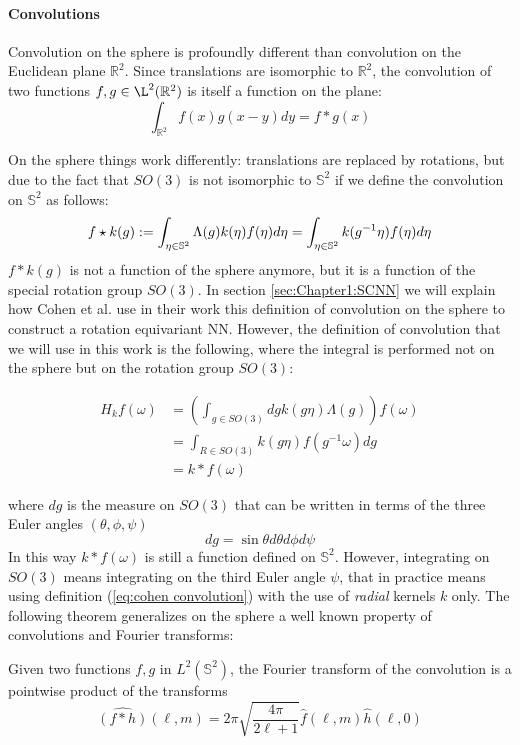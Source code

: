 \paragraph{Convolutions}
Convolution on the sphere is profoundly different than convolution on the Euclidean plane $\mathbb R^2$. Since translations are isomorphic to $\mathbb R^2$, the convolution of two functions $f, g \in \L^2(\mathbb R^2)$ is itself a function on the plane:
$$ \int_{\mathbb R^2} f(x)g(x-y)dy = f*g(x)$$

On the sphere things work differently: translations are replaced by rotations, but due to the fact that $SO(3)$ is not isomorphic to $\mathbb S^2$ if we define the convolution on $\mathbb S^2$ as follows:
\begin{equation} \label{eq:cohen convolution}
f\star k(g) := \int_{\eta \in \mathbb S^2} \Lambda(g)k( \eta) f(\eta) d\eta=\int_{\eta \in \mathbb S^2} k(g^{-1} \eta) f(\eta) d\eta\\ 
\end{equation}
$f*k(g)$ is not a function of the sphere anymore, but it is a function of the special rotation group $SO(3)$. In section \ref{sec:Chapter1:SCNN} we will explain how Cohen et al. \cite{SCNN} use in their work this definition of convolution on the sphere to construct a rotation equivariant NN. However, the definition of convolution that we will use in this work is the following, where the integral is performed not on the sphere but on the rotation group $SO(3)$:

\begin{equation}\label{eq:convolution}
	\begin{aligned} H_{k} f(\omega) &=\left(\int_{g \in S O(3)} d g k(g \eta) \Lambda(g)\right) f(\omega) \\ &=\int_{R \in S O(3)} k(g \eta) f\left(g^{-1} \omega\right) d g \\ &=k * f(\omega) \end{aligned}
\end{equation}

where $dg$ is the measure on $SO(3)$ that can be written in terms of the three Euler angles $(\theta, \phi, \psi)$ 
$$dg=\sin\theta d\theta d\phi d\psi$$
In this way $k * f(\omega)$ is still a function defined on $\mathbb S^2$. However, integrating on $SO(3)$ means integrating on the third Euler angle $\psi$, that in practice means using definition (\ref{eq:cohen convolution}) with the use of \textit{radial} kernels $k$ only.
The following theorem generalizes on the sphere a well known property of convolutions and Fourier transforms: 
\vspace{0.5cm}
\begin{theorem}\label{theo:convolution}
	Given two functions $f, g$ in $L^2(\mathbb S^2)$, the Fourier transform of the convolution is a pointwise product of the transforms
$$
\hat{(f * h)}(\ell, m)=2 \pi \sqrt{\frac{4 \pi}{2 \ell+1}} \hat{f}(\ell, m) \hat{h}(\ell, 0)
$$
\end{theorem}
\vspace{0.5cm}

